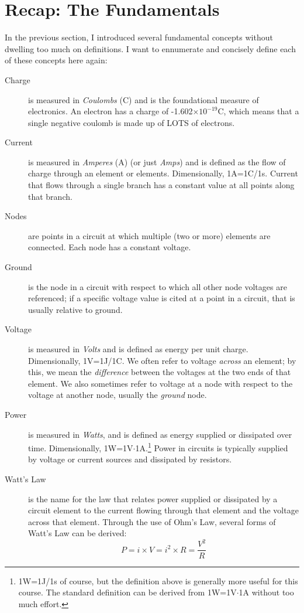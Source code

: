 \section{Recap: The Fundamentals}
In the previous section, I introduced several fundamental concepts without dwelling too much on definitions. I want to ennumerate and concisely define each of these concepts here again:
\begin{description}
\item[Charge] is measured in \textit{Coulombs} (C) and is the foundational measure of electronics. An electron has a charge of -1.602$\times10^{-19}$C, which means that a single negative coulomb is made up of LOTS of electrons.

\item[Current] is measured in \textit{Amperes} (A) (or just \textit{Amps}) and is defined as the flow of charge through an element or elements. Dimensionally, 1A=1C/1s. Current that flows through a single branch has a constant value at all points along that branch.

\item[Nodes] are points in a circuit at which multiple (two or more) elements are connected. Each node has a constant voltage.
\item[Ground] is the node in a circuit with respect to which all other node voltages are referenced; if a specific voltage value is cited at a point in a circuit, that is usually relative to ground.

\item[Voltage] is measured in \textit{Volts} and is defined as energy per unit charge. Dimensionally, 1V=1J/1C. We often refer to voltage \textit{across} an element; by this, we mean the \textit{difference} between the voltages at the two ends of that element. We also sometimes refer to voltage at a node with respect to the voltage at another node, usually the \textit{ground} node.

\item[Power] is measured in \textit{Watts}, and is defined as energy supplied or dissipated over time. Dimensionally, 1W=1V$\cdot$1A.\footnote{1W=1J/1s of course, but the definition above is generally more useful for this course. The standard definition can be derived from 1W=1V$\cdot$1A without too much effort.} Power in circuits is typically supplied by voltage or current sources and dissipated by resistors.

\item[Watt's Law] is the name for the law that relates power supplied or dissipated by a circuit element to the current flowing through that element and the voltage across that element. Through the use of Ohm's Law, several forms of Watt's Law can be derived: 
$$
P = i \times V = i^2 \times R = \frac{V^2}{R}
$$


\end{description}

